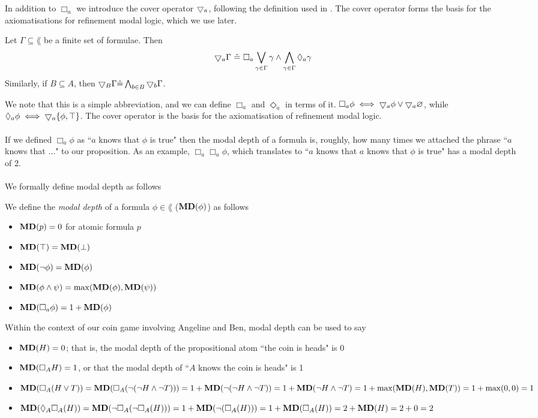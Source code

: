 In addition to $\Box_a$ we introduce the cover operator $\bigtriangledown_a$, following the definition used in
\cite{venemaproofsystems}.
The cover operator forms the basis for the axiomatisations for refinement modal logic, which we use
later.

\begin{defn} \label{coverDef}
Let $\Gamma \subseteq \lang$ be a finite set of formulae.
Then
\[
	\bigtriangledown_a \Gamma \text{ } \hat{=} \text{ } \Box_a \bigvee_{\gamma \in \Gamma} \gamma \land
  \bigwedge_{\gamma \in \Gamma} \Diamond_a \gamma
\]
Similarly, if $B \subseteq A$, then $\bigtriangledown_B \Gamma \hat{=} \bigwedge_{b \in B}
\bigtriangledown_b \Gamma$.
\end{defn}
We note that this is a simple abbreviation, and we can define $\Box_a$ and
$\Diamond_a$ in terms of it.
$\Box_a \phi \iff \bigtriangledown_a \phi \lor \bigtriangledown_a \varnothing$, while $\Diamond_a
\phi \iff \bigtriangledown_a \{\phi, \top\}$.
The cover operator is the basis for the axiomatisation of refinement modal logic.\\
\\
If we defined $\Box_a \phi$ as ``$a$ knows that $\phi$ is true" then the modal depth of a formula is, roughly,
how many times we attached the phrase ``$a$ knows that $\ldots$" to our proposition.
As an example, $\Box_a \Box_a \phi$, which translates to ``$a$ knows that $a$ knows that $\phi$ is
true" has a modal depth of 2.\\
\\
We formally define modal depth as follows

\begin{defn} \label{modalDepth}
We define the {\em modal depth} of a formula $\phi \in \lang$ (${\bf MD}(\phi)$) as follows
\begin{itemize}
	\item ${\bf MD}(p) = 0$ for atomic formula $p$
	\item ${\bf MD}(\top) = {\bf MD}(\bot)$
	\item ${\bf MD}(\neg \phi) = {\bf MD}(\phi)$
	\item ${\bf MD}(\phi \land \psi) = \max({\bf MD}(\phi), {\bf MD}(\psi))$
	\item ${\bf MD}(\Box_a \phi) = 1 + {\bf MD}(\phi)$
\end{itemize}
\end{defn}

Within the context of our coin game involving Angeline and Ben, modal depth can be used to say
\begin{itemize}
	\item ${\bf MD}(H) = 0$; that is, the modal depth of the propositional atom ``the coin is heads" is 0
	\item ${\bf MD}(\Box_A H) = 1$, or that the modal depth of ``$A$ knows the coin is heads" is 1
	\item ${\bf MD}(\Box_A (H \lor T)) = {\bf MD}(\Box_A(\neg(\neg H \land \neg T))) = 1 + {\bf MD}(\neg(\neg H
		\land \neg T)) = 1 + {\bf MD}(\neg H \land \neg T) = 1 + \max({\bf MD}(H),{\bf MD}(T)) = 1 + \max(0,0) = 1$
	\item ${\bf MD}(\Diamond_A \Box_A (H)) = {\bf MD}(\neg \Box_A (\neg \Box_A (H))) = 1 + {\bf MD}(\neg(\Box_A(H)))
		= 1 + {\bf MD}(\Box_A(H)) = 2 + {\bf MD}(H) = 2 + 0 =  2$
\end{itemize}


